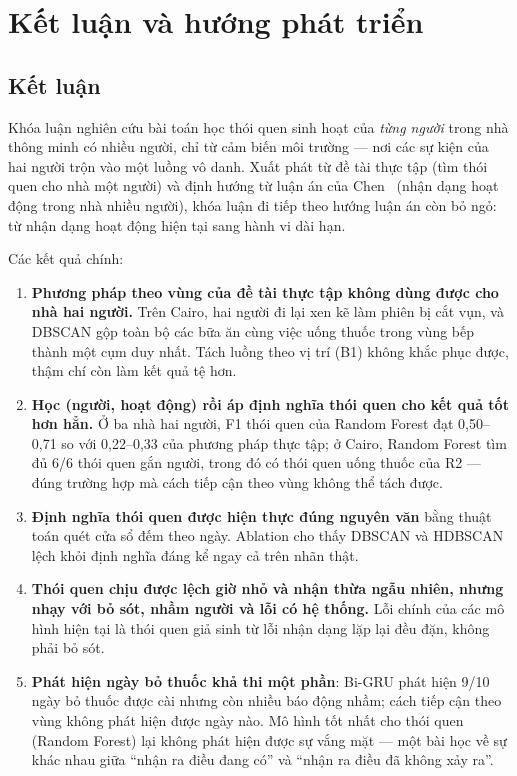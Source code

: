 \chapter{Kết luận và hướng phát triển}
\label{chap:conclusion}

\section{Kết luận}

Khóa luận nghiên cứu bài toán học thói quen sinh hoạt của \emph{từng người} trong nhà thông minh có
nhiều người, chỉ từ cảm biến môi trường --- nơi các sự kiện của hai người trộn vào một luồng vô danh.
Xuất phát từ đề tài thực tập (tìm thói quen cho nhà một người) và định hướng từ luận án của
Chen~\cite{chen2021thesis} (nhận dạng hoạt động trong nhà nhiều người), khóa luận đi tiếp theo hướng
luận án còn bỏ ngỏ: từ nhận dạng hoạt động hiện tại sang hành vi dài hạn.

Các kết quả chính:

\begin{enumerate}
  \item \textbf{Phương pháp theo vùng của đề tài thực tập không dùng được cho nhà hai người.} Trên Cairo,
  hai người đi lại xen kẽ làm phiên bị cắt vụn, và DBSCAN gộp toàn bộ các bữa ăn cùng việc uống thuốc
  trong vùng bếp thành một cụm duy nhất. Tách luồng theo vị trí (B1) không khắc phục được, thậm chí còn
  làm kết quả tệ hơn.
  \item \textbf{Học (người, hoạt động) rồi áp định nghĩa thói quen cho kết quả tốt hơn hẳn.} Ở ba nhà hai
  người, F1 thói quen của Random Forest đạt 0,50--0,71 so với 0,22--0,33 của phương pháp thực tập; ở Cairo, Random Forest
  tìm đủ 6/6 thói quen gắn người, trong đó có thói quen uống thuốc của R2 --- đúng trường hợp mà cách
  tiếp cận theo vùng không thể tách được.
  \item \textbf{Định nghĩa thói quen được hiện thực đúng nguyên văn} bằng thuật toán quét cửa sổ đếm theo
  ngày. Ablation cho thấy DBSCAN và HDBSCAN lệch khỏi định nghĩa đáng kể ngay cả trên nhãn thật.
  \item \textbf{Thói quen chịu được lệch giờ nhỏ và nhận thừa ngẫu nhiên, nhưng nhạy với bỏ sót, nhầm
  người và lỗi có hệ thống.} Lỗi chính của các mô hình hiện tại là thói quen giả sinh từ lỗi nhận dạng lặp
  lại đều đặn, không phải bỏ sót.
  \item \textbf{Phát hiện ngày bỏ thuốc khả thi một phần}: Bi-GRU phát hiện 9/10 ngày bỏ thuốc được cài
  nhưng còn nhiều báo động nhầm; cách tiếp cận theo vùng không phát hiện được ngày nào. Mô hình tốt nhất cho
  thói quen (Random Forest) lại không phát hiện được sự vắng mặt --- một bài học về sự khác nhau giữa
  ``nhận ra điều đang có'' và ``nhận ra điều đã không xảy ra''.
\end{enumerate}

